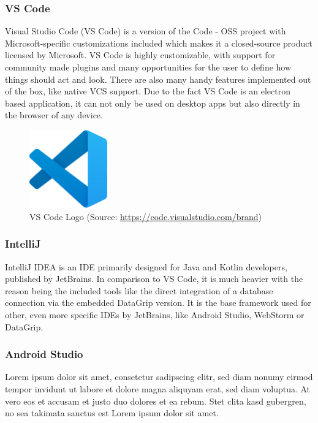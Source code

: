 \Author{\daAuthorTwo}

\subsubsection{VS Code}
Visual Studio Code (VS Code) is a version of the Code - OSS project with Microsoft-specific customizations included which makes it a closed-source product licensed by Microsoft. VS Code is highly customizable, with support for community made plugins and many opportunities for the user to define how things should act and look. \autocite{VSCode:readMe} There are also many handy features implemented out of the box, like native VCS support. Due to the fact VS Code is an electron based application, it can not only be used on desktop apps but also directly in the browser of any device. \autocite{VSCode:electron} \autocite{VSCode:web}

\begin{figure} [H]
    \center
    \includegraphics [width=0.3\textwidth] {images/Technologies/vscodeLogo.png}
    \caption{VS Code Logo (Source: \url{https://code.visualstudio.com/brand})}
\end{figure}

\subsubsection{IntelliJ}
IntelliJ IDEA is an IDE primarily designed for Java and Kotlin developers, published by JetBrains. In comparison to VS Code, it is much heavier with the reason being the included tools like the direct integration of a database connection via the embedded DataGrip version. It is the base framework used for other, even more specific IDEs by JetBrains, like Android Studio, WebStorm or DataGrip.

\subsubsection{Android Studio}
Lorem ipsum dolor sit amet, consetetur sadipscing elitr, sed diam nonumy eirmod tempor invidunt ut labore et dolore magna aliquyam erat, sed diam voluptua. At vero eos et accusam et justo duo dolores et ea rebum. Stet clita kasd gubergren, no sea takimata sanctus est Lorem ipsum dolor sit amet.

